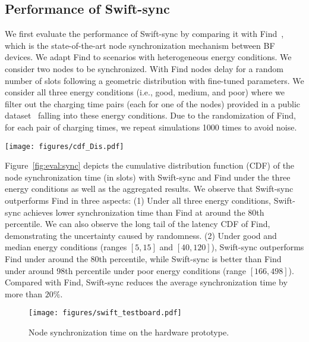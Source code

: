 \documentclass[lettersize,journal]{IEEEtran}
\newcommand{\sync}{Swift-sync\xspace}
\begin{document}
\subsection{Performance of \sync}
We first evaluate the performance of \sync by comparing it with Find~\cite{2021-nsdi-find}, 
which is the state-of-the-art node synchronization mechanism between BF devices. We adapt Find to scenarios with heterogeneous energy conditions. We consider two nodes to be synchronized. With Find nodes delay for a random number of slots following a geometric distribution with fine-tuned parameters. We consider all three energy conditions (i.e., good, medium, and poor) where we filter out the charging time pairs (each for one of the nodes) provided in a public dataset~\cite{2021-nsdi-find} falling into these energy conditions. Due to the randomization of Find, for each pair of charging times, we repeat simulations 1000 times to avoid noise. 

\begin{figure*}[!t]
    \centering
    \texttt{[image: figures/cdf\_Dis.pdf]}
    \caption{Node synchronization time (in slots) with \sync and Find~\cite{2021-nsdi-find} under varying energy condition ranges. The markers denote the 99th percentile.}
    \label{fig:eval:sync}
\end{figure*}

Figure~\ref{fig:eval:sync} depicts the cumulative distribution function (CDF) of the node synchronization time (in slots) with \sync and Find under the three energy conditions as well as the aggregated results. We observe that \sync outperforms Find in three aspects: (1) Under all three energy conditions, \sync achieves lower synchronization time than Find at around the 80th percentile. We can also observe the long tail of the latency CDF of Find, demonstrating the uncertainty caused by randomness. 
(2) Under good and median energy conditions (ranges $[5, 15]$ and $[40, 120]$), \sync outperforms Find under around the 80th percentile, while \sync is better than Find under around 98th percentile under poor energy conditions (range $[166,498]$). Compared with Find, \sync reduces the average synchronization time by more than $20\%$. 

\begin{figure}[!t]
    \centering
    \texttt{[image: figures/swift\_testboard.pdf]}
    \caption{Node synchronization time on the hardware prototype.}
    \label{fig:syn:testbed}
\end{figure}
\end{document}
